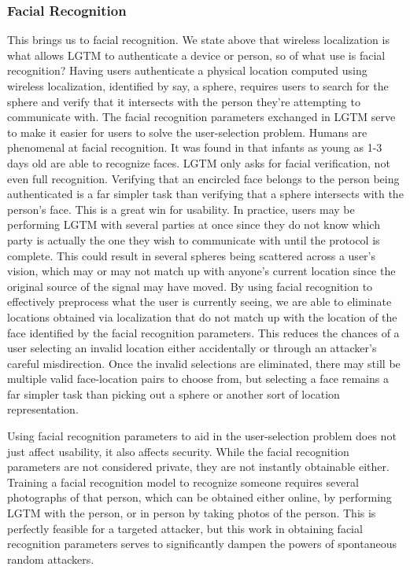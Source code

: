 \documentclass[12pt]{report}
\begin{document}
\subsubsection{Facial Recognition}
This brings us to facial recognition. We state above that wireless localization is what allows LGTM to authenticate a device or person, so of what use is facial recognition? Having users authenticate a physical location computed using wireless localization, identified by say, a sphere, requires users to search for the sphere and verify that it intersects with the person they're attempting to communicate with. The facial recognition parameters exchanged in LGTM serve to make it easier for users to solve the user-selection problem. Humans are phenomenal at facial recognition. It was found in \cite{NewbornsFaceRecognitionTurati2006} that infants as young as 1-3 days old are able to recognize faces. LGTM only asks for facial verification, not even full recognition. Verifying that an encircled face belongs to the person being authenticated is a far simpler task than verifying that a sphere intersects with the person's face. This is a great win for usability. In practice, users may be performing LGTM with several parties at once since they do not know which party is actually the one they wish to communicate with until the protocol is complete. This could result in several spheres being scattered across a user's vision, which may or may not match up with anyone's current location since the original source of the signal may have moved. By using facial recognition to effectively preprocess what the user is currently seeing, we are able to eliminate locations obtained via localization that do not match up with the location of the face identified by the facial recognition parameters. This reduces the chances of a user selecting an invalid location either accidentally or through an attacker's careful misdirection. Once the invalid selections are eliminated, there may still be multiple valid face-location pairs to choose from, but selecting a face remains a far simpler task than picking out a sphere or another sort of location representation. \par

Using facial recognition parameters to aid in the user-selection problem does not just affect usability, it also affects security. While the facial recognition parameters are not considered private, they are not instantly obtainable either. Training a facial recognition model to recognize someone requires several photographs of that person, which can be obtained either online, by performing LGTM with the person, or in person by taking photos of the person. This is perfectly feasible for a targeted attacker, but this work in obtaining facial recognition parameters serves to significantly dampen the powers of spontaneous random attackers. \par
\end{document}
